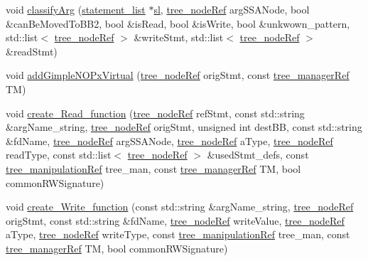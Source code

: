 \begin{DoxyCompactItemize}
\item 
void \hyperlink{classinterface__infer_afb57e923fa70473d88a87f9d9a4482c1}{classify\+Arg} (\hyperlink{structstatement__list}{statement\+\_\+list} $\ast$\hyperlink{tutorial__pnnl__2019_2optimizations_2second_2solution_2adpcm_8c_ace9c0991f7fffe6ab436175d7fff821e}{sl}, \hyperlink{tree__node_8hpp_a6ee377554d1c4871ad66a337eaa67fd5}{tree\+\_\+node\+Ref} arg\+S\+S\+A\+Node, bool \&can\+Be\+Moved\+To\+B\+B2, bool \&is\+Read, bool \&is\+Write, bool \&unkwown\+\_\+pattern, std\+::list$<$ \hyperlink{tree__node_8hpp_a6ee377554d1c4871ad66a337eaa67fd5}{tree\+\_\+node\+Ref} $>$ \&write\+Stmt, std\+::list$<$ \hyperlink{tree__node_8hpp_a6ee377554d1c4871ad66a337eaa67fd5}{tree\+\_\+node\+Ref} $>$ \&read\+Stmt)
\item 
void \hyperlink{classinterface__infer_aebc13d03184a040770e742f5e9e8320a}{add\+Gimple\+N\+O\+Px\+Virtual} (\hyperlink{tree__node_8hpp_a6ee377554d1c4871ad66a337eaa67fd5}{tree\+\_\+node\+Ref} orig\+Stmt, const \hyperlink{tree__manager_8hpp_a96ff150c071ce11a9a7a1e40590f205e}{tree\+\_\+manager\+Ref} TM)
\item 
void \hyperlink{classinterface__infer_a99d0aeddc3181d958d1ecc3df7f298a7}{create\+\_\+\+Read\+\_\+function} (\hyperlink{tree__node_8hpp_a6ee377554d1c4871ad66a337eaa67fd5}{tree\+\_\+node\+Ref} ref\+Stmt, const std\+::string \&arg\+Name\+\_\+string, \hyperlink{tree__node_8hpp_a6ee377554d1c4871ad66a337eaa67fd5}{tree\+\_\+node\+Ref} orig\+Stmt, unsigned int dest\+BB, const std\+::string \&fd\+Name, \hyperlink{tree__node_8hpp_a6ee377554d1c4871ad66a337eaa67fd5}{tree\+\_\+node\+Ref} arg\+S\+S\+A\+Node, \hyperlink{tree__node_8hpp_a6ee377554d1c4871ad66a337eaa67fd5}{tree\+\_\+node\+Ref} a\+Type, \hyperlink{tree__node_8hpp_a6ee377554d1c4871ad66a337eaa67fd5}{tree\+\_\+node\+Ref} read\+Type, const std\+::list$<$ \hyperlink{tree__node_8hpp_a6ee377554d1c4871ad66a337eaa67fd5}{tree\+\_\+node\+Ref} $>$ \&used\+Stmt\+\_\+defs, const \hyperlink{tree__manipulation_8hpp_a1a9460e3a2f9fc6a96cfd2f24cc9b2a5}{tree\+\_\+manipulation\+Ref} tree\+\_\+man, const \hyperlink{tree__manager_8hpp_a96ff150c071ce11a9a7a1e40590f205e}{tree\+\_\+manager\+Ref} TM, bool common\+R\+W\+Signature)
\item 
void \hyperlink{classinterface__infer_a7a20911ad7bad6cbb4afee947f26131e}{create\+\_\+\+Write\+\_\+function} (const std\+::string \&arg\+Name\+\_\+string, \hyperlink{tree__node_8hpp_a6ee377554d1c4871ad66a337eaa67fd5}{tree\+\_\+node\+Ref} orig\+Stmt, const std\+::string \&fd\+Name, \hyperlink{tree__node_8hpp_a6ee377554d1c4871ad66a337eaa67fd5}{tree\+\_\+node\+Ref} write\+Value, \hyperlink{tree__node_8hpp_a6ee377554d1c4871ad66a337eaa67fd5}{tree\+\_\+node\+Ref} a\+Type, \hyperlink{tree__node_8hpp_a6ee377554d1c4871ad66a337eaa67fd5}{tree\+\_\+node\+Ref} write\+Type, const \hyperlink{tree__manipulation_8hpp_a1a9460e3a2f9fc6a96cfd2f24cc9b2a5}{tree\+\_\+manipulation\+Ref} tree\+\_\+man, const \hyperlink{tree__manager_8hpp_a96ff150c071ce11a9a7a1e40590f205e}{tree\+\_\+manager\+Ref} TM, bool common\+R\+W\+Signature)

\end{DoxyCompactItemize}
